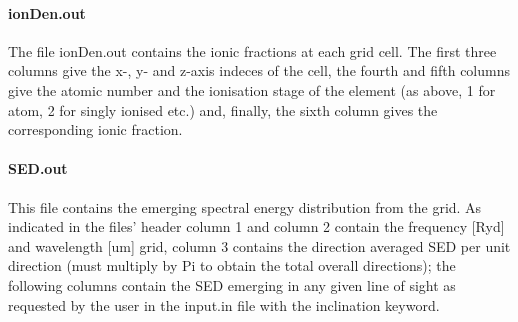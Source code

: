 \documentclass[11pt]{article}
\begin{document}
\paragraph{    ionDen.out}
    The file ionDen.out contains the ionic fractions at each grid cell. The first 
    three columns give the x-, y- and z-axis indeces of the cell, the fourth and 
    fifth columns give the atomic number and the ionisation stage of the element 
    (as above, 1 for atom, 2 for singly ionised etc.) and, finally, the sixth 
    column gives the corresponding ionic fraction.\\

\paragraph{    SED.out}
    This file contains the emerging spectral energy distribution from the grid. 
    As indicated in the files' header column 1 and column 2 contain the frequency 
    [Ryd] and wavelength [um] grid, column 3 contains the direction averaged 
    SED per unit direction (must multiply by Pi to obtain the total overall 
    directions); the following columns contain the SED emerging in any given 
    line of sight as requested by the user in the input.in file with the 
    inclination keyword.\\
\end{document}
